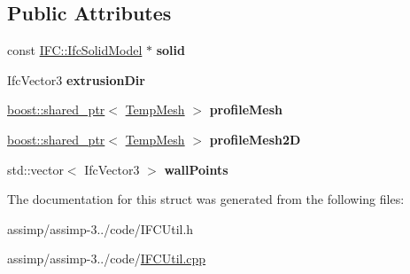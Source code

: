 \subsection*{Public Attributes}
\begin{DoxyCompactItemize}
\item 
\hypertarget{struct_assimp_1_1_i_f_c_1_1_temp_opening_a1ec74e1ef02d88f40f0cd2b9e95491b5}{const \hyperlink{struct_assimp_1_1_i_f_c_1_1_ifc_solid_model}{I\+F\+C\+::\+Ifc\+Solid\+Model} $\ast$ {\bfseries solid}}\label{struct_assimp_1_1_i_f_c_1_1_temp_opening_a1ec74e1ef02d88f40f0cd2b9e95491b5}

\item 
\hypertarget{struct_assimp_1_1_i_f_c_1_1_temp_opening_a33d5319ff25b4fcd7aa23a6b6e073ba2}{Ifc\+Vector3 {\bfseries extrusion\+Dir}}\label{struct_assimp_1_1_i_f_c_1_1_temp_opening_a33d5319ff25b4fcd7aa23a6b6e073ba2}

\item 
\hypertarget{struct_assimp_1_1_i_f_c_1_1_temp_opening_aceda93672f653044eb75a64c9406f752}{\hyperlink{classboost_1_1shared__ptr}{boost\+::shared\+\_\+ptr}$<$ \hyperlink{struct_assimp_1_1_i_f_c_1_1_temp_mesh}{Temp\+Mesh} $>$ {\bfseries profile\+Mesh}}\label{struct_assimp_1_1_i_f_c_1_1_temp_opening_aceda93672f653044eb75a64c9406f752}

\item 
\hypertarget{struct_assimp_1_1_i_f_c_1_1_temp_opening_a7ed5a28b1cf08f01aab67136151767e6}{\hyperlink{classboost_1_1shared__ptr}{boost\+::shared\+\_\+ptr}$<$ \hyperlink{struct_assimp_1_1_i_f_c_1_1_temp_mesh}{Temp\+Mesh} $>$ {\bfseries profile\+Mesh2\+D}}\label{struct_assimp_1_1_i_f_c_1_1_temp_opening_a7ed5a28b1cf08f01aab67136151767e6}

\item 
\hypertarget{struct_assimp_1_1_i_f_c_1_1_temp_opening_adbcbc46135fc037ff016d299572be3ff}{std\+::vector$<$ Ifc\+Vector3 $>$ {\bfseries wall\+Points}}\label{struct_assimp_1_1_i_f_c_1_1_temp_opening_adbcbc46135fc037ff016d299572be3ff}

\end{DoxyCompactItemize}


The documentation for this struct was generated from the following files\+:\begin{DoxyCompactItemize}
\item 
assimp/assimp-\/3../code/I\+F\+C\+Util.\+h\item 
assimp/assimp-\/3../code/\hyperlink{_i_f_c_util_8cpp}{I\+F\+C\+Util.\+cpp}\end{DoxyCompactItemize}
